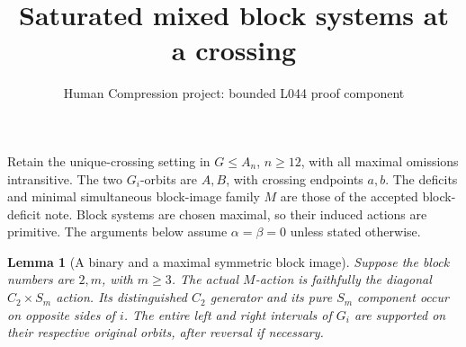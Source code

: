\documentclass[11pt,a4paper]{article}
\title{Saturated mixed block systems at a crossing}
\author{Human Compression project: bounded L044 proof component}
\date{}
\newtheorem{lemma}{Lemma}
\begin{document}
\maketitle
Retain the unique-crossing setting in $G\leq A_n$, $n\geq12$,
with all maximal omissions intransitive. The two $G_i$-orbits
are $A,B$, with crossing endpoints $a,b$. The deficits and
minimal simultaneous block-image family $M$ are those of the
accepted block-deficit note. Block systems are chosen maximal,
so their induced actions are primitive. The arguments below
assume $\alpha=\beta=0$ unless stated otherwise.

\begin{lemma}[A binary and a maximal symmetric block image]
Suppose the block numbers are $2,m$, with $m\geq3$. The actual
$M$-action is faithfully the diagonal $C_2\times S_m$ action.
Its distinguished $C_2$ generator and its pure $S_m$ component
occur on opposite sides of $i$. The entire left and right
intervals of $G_i$ are supported on their respective original
orbits, after reversal if necessary.
\end{lemma}
\end{document}
